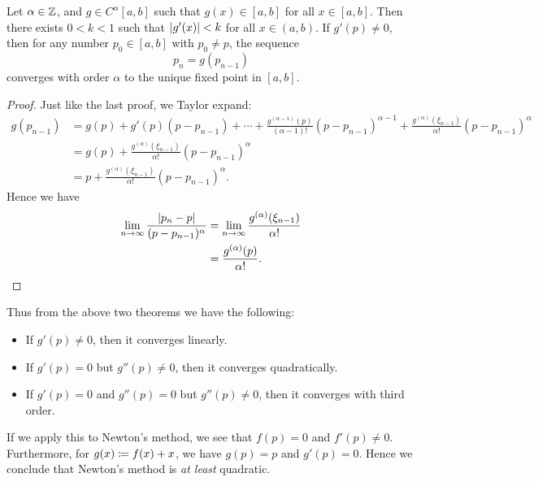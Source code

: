 \documentclass[class=article, crop=false]{standalone}
\begin{document}
  \begin{theorem}{}
    Let $\alpha\in\mathbb{Z}$, and $g\in C^\alpha[a, b]$ such that $g(x)\in [a, b]$ for all $x\in [a, b]$. Then there exists $0 < k < 1$ such that $\left\lvert g'(x) \right\rvert < k$ for all $x\in (a, b)$. If $g'(p)\neq 0$, then for any number $p_0\in [a, b]$ with $p_0\neq p$, the sequence
    \[
      p_n = g(p_{n - 1})\tag{$n\geq 1$}
    \]
    converges with order $\alpha$ to the unique fixed point in $[a, b]$.
    \begin{proof}
      Just like the last proof, we Taylor expand:
      \begin{align*}
        g(p_{n - 1}) &= g(p) + g'(p)(p - p_{n - 1}) + \dotsb + \frac{g^{(\alpha - 1)}(p)}{(\alpha - 1)!}(p - p_{n - 1})^{\alpha - 1} + \frac{g^{(\alpha)}(\xi_{n - 1})}{\alpha!}(p - p_{n - 1})^\alpha \\
                     &= g(p) + \frac{g^{(\alpha)}(\xi_{n - 1})}{\alpha!}(p - p_{n - 1})^\alpha \\
                     &= p + \frac{g^{(\alpha)}(\xi_{n - 1})}{\alpha!}(p - p_{n - 1})^\alpha.
      \end{align*}
      Hence we have
      \begin{align*}
        \lim_{n\to \infty} \frac{\left\lvert p_n - p \right\rvert}{(p - p_{n - 1})^\alpha} &= \lim_{n\to \infty} \frac{g^{(\alpha)}(\xi_{n - 1})}{\alpha!} \\
                                                                        &= \frac{g^{(\alpha)}(p)}{\alpha!}.
      \end{align*}
    \end{proof}
  \end{theorem}
  Thus from the above two theorems we have the following:
  \begin{itemize}
    \item If $g'(p)\neq 0$, then it converges linearly.
    \item If $g'(p) = 0$ but $g''(p)\neq 0$, then it converges quadratically.
    \item If $g'(p) = 0$ and $g''(p) = 0$ but $g''(p)\neq 0$, then it converges with third order.
  \end{itemize}
  If we apply this to Newton's method, we see that $f(p) = 0$ and $f'(p)\neq 0$. Furthermore, for $g(x)\coloneqq f(x) + x$, we have $g(p) = p$ and $g'(p) = 0$. Hence we conclude that Newton's method is \emph{at least} quadratic.
\end{document}
